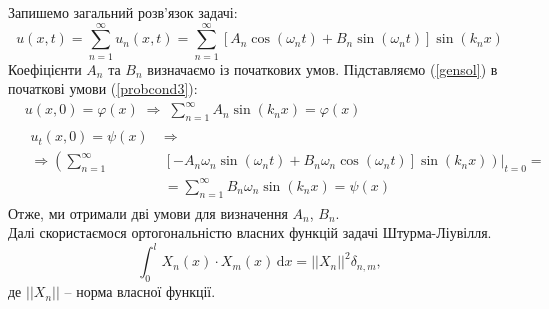 Запишемо загальний розв'язок задачі:
\begin{equation} \label{gensol}
    u(x,t) = \sum^{\infty}_{n=1} u_n(x,t) = \sum^{\infty}_{n=1} \left[A_n\cos(\omega_n t) + B_n\sin(\omega_n t)\right] \sin(k_n x)
\end{equation}
Коефіцієнти $A_n$ та $B_n$ визначаємо із початкових умов. Підставляємо (\ref{gensol}) в початкові умови (\ref{probcond3}):
\begin{equation} \label{sol-init-cond}
    \begin{aligned}
        &u(x,0) = \varphi(x)
        \;\Rightarrow\;
        \sum^{\infty}_{n=1} A_n\sin(k_n x) = \varphi(x)\\
        &\begin{aligned}
            u_t(x,0) = \psi(x)
            \;&\Rightarrow\\
            \Rightarrow \left(\sum^{\infty}_{n=1}\right.&\left.\left. \left[-A_n\omega_n\sin(\omega_n t) + B_n\omega_n\cos(\omega_n t)\right] \sin(k_n x)\right)\right|_{t=0} =\\
            &= \sum^{\infty}_{n=1} B_n\omega_n\sin(k_n x) = \psi(x)
        \end{aligned}
    \end{aligned}
\end{equation}
Отже, ми отримали дві умови для визначення $A_n$, $B_n$.\\
Далі скористаємося ортогональністю власних функцій задачі Штурма-Ліувілля.
\begin{equation} \label{orth}
    \int_0^l X_n(x) \cdot X_m(x) \,\mathrm{d}x = ||X_n||^2\delta_{n,m},
\end{equation}
де $||X_n||$ -- норма власної функції.

